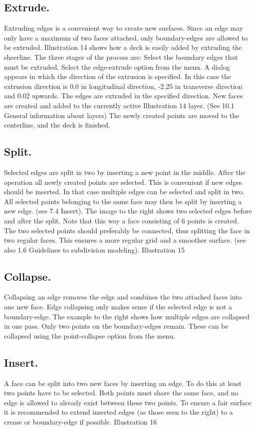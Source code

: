 \documentclass[12pt]{article}
\begin{document}
\subsection{Extrude.}
Extruding edges is a convenient way to create new surfaces.
Since an edge may only have a maximum of two faces
attached, only boundary-edges are allowed to be extruded.
Illustration 14 shows how a deck is easily added by extruding
the sheerline. The three stages of the process are:
Select the boundary edges that must be extruded.
Select the edge-extrude option from the menu. A
dialog appears in which the direction of the extrusion is
specified. In this case the extrusion direction is 0.0 in
longitudinal direction, -2.25 in transverse direction and
0.02 upwards.
The edges are extruded in the specified direction. New
faces are created and added to the currently active
 Illustration 14
layer. (See 10.1 General information about layers)
The newly created points are moved to the centerline, and the deck is finished.

\subsection{Split.}
Selected edges are split in two by inserting a new
point in the middle. After the operation all newly
created points are selected. This is convenient if new
edges should be inserted. In that case multiple edges
can be selected and split in two. All selected points
belonging to the same face may then be split by
inserting a new edge. (see 7.4 Insert). The image to
the right shows two selected edges before and after
the split. Note that this way a face consisting of 6
points is created. The two selected points should
preferably be connected, thus splitting the face in two
regular faces. This ensures a more regular grid and a
smoother surface. (see also 1.6 Guidelines to
subdivision modeling).
Illustration 15

\subsection{Collapse.} \label{edge-collapse}
Collapsing an edge removes the edge and combines the two attached faces into one new face.
Edge collapsing only makes sense if the selected edge is not a boundary-edge. The example to the
right shows how multiple edges are collapsed in one pass. Only two points on the boundary-edges
remain. These can be collapsed using the point-collapse option from the menu.

\subsection{Insert.}
A face can be split into two new faces by
inserting an edge. To do this at least two points
have to be selected. Both points must share the
same face, and no edge is allowed to already
exist between these two points. To ensure a fair
surface it is recommended to extend inserted
edges (as those seen to the right) to a crease or
boundary-edge if possible.
Illustration 16
\end{document}
